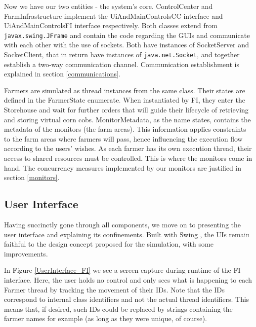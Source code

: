 \documentclass[12pt]{article}
\begin{document}
Now we have our two entities - the system's core.
ControlCenter and FarmInfrastructure implement the UiAndMainControlsCC interface and UiAndMainControlsFI interface respectively.
Both classes extend from \texttt{javax.swing.JFrame} and contain the code regarding the GUIs and communicate with each other with the use of sockets.
Both have instances of SocketServer and SocketClient, that in return have instances of \texttt{java.net.Socket}, and together establish a two-way communication channel.
Communication establishment is explained in section \ref{communications}.

Farmers are simulated as thread instances from the same class.
Their states are defined in the FarmerState enumerate.
When instantiated by FI, they enter the Storehouse and wait for further orders that will guide their lifecycle of retrieving and storing virtual corn cobs.
MonitorMetadata, as the name states, contains the metadata of the monitors (the farm areas).
This information applies constraints to the farm areas where farmers will pass, hence influencing the execution flow according to the users' wishes.
As each farmer has its own execution thread, their access to shared resources must be controlled.
This is where the monitors come in hand. 
The concurrency measures implemented by our monitors are justified in section \ref{monitors}. 

\subsection{User Interface} %

Having succinctly gone through all components, we move on to presenting the user interface and explaining its confinements.
Built with Swing \cite{swing}, the UIs remain faithful to the design concept proposed for the simulation, with some improvements.

In Figure \ref{UserInterface_FI} we see a screen capture during runtime of the FI interface.
Here, the user holds no control and only sees what is happening to each Farmer thread by tracking the movement of their IDs.
Note that the IDs correspond to internal class identifiers and not the actual thread identifiers.
This means that, if desired, such IDs could be replaced by strings containing the farmer names for example (as long as they were unique, of course).
\end{document}
